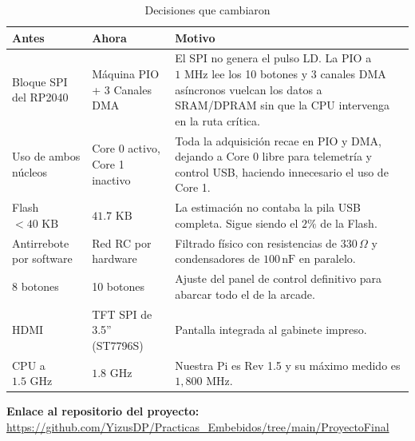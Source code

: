 \documentclass[conference]{IEEEtran}
\begin{document}
\begin{table}[H]
    \centering
    \caption{Decisiones que cambiaron}
    \label{tab:cambios}
    \small
    \begin{tabular}{|p{1.9cm}|p{1.9cm}|p{3.5cm}|}
        \hline
        \textbf{Antes} & \textbf{Ahora} & \textbf{Motivo} \\
        \hline
        Bloque SPI del RP2040 & Máquina PIO + 3 Canales DMA & El SPI no genera el pulso LD. La PIO a $1\text{ MHz}$ lee los 10 botones y 3 canales DMA asíncronos vuelcan los datos a SRAM/DPRAM sin que la CPU intervenga en la ruta crítica. \\
        \hline
        Uso de ambos núcleos & Core 0 activo, Core 1 inactivo & Toda la adquisición recae en PIO y DMA, dejando a Core 0 libre para telemetría y control USB, haciendo innecesario el uso de Core 1. \\
        \hline
        Flash $< 40\text{ KB}$ & $41.7\text{ KB}$ & La estimación no contaba la pila USB completa. Sigue siendo el $2\%$ de la Flash. \\
        \hline
        Antirrebote por software & Red RC por hardware & Filtrado físico con resistencias de $330\,\Omega$ y condensadores de $100\,\text{nF}$ en paralelo. \\
        \hline
        8 botones & 10 botones & Ajuste del panel de control definitivo para abarcar todo el de la arcade. \\
        \hline
        HDMI & TFT SPI de 3.5'' (ST7796S) & Pantalla integrada al gabinete impreso. \\
        \hline
        CPU a $1.5\text{ GHz}$ & $1.8\text{ GHz}$ & Nuestra Pi es Rev 1.5 y su máximo medido es $1{,}800\text{ MHz}$. \\
        \hline
    \end{tabular}
\end{table}

\vspace{0.5cm}

\noindent
\textbf{Enlace al repositorio del proyecto:} \\
\url{https://github.com/YizusDP/Practicas_Embebidos/tree/main/ProyectoFinal}
\end{document}
